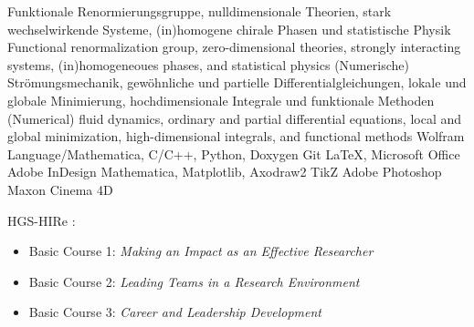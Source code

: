 \documentclass[color=TUDa-1b]{komacv}
\begin{document}




\cvitem%
	{}%
	{\lang%
		{Funktionale Renormierungsgruppe, nulldimensionale Theorien, stark wechselwirkende Systeme, (in)homogene chirale Phasen und statistische Physik}%
		{Functional renormalization group, zero-dimensional theories, strongly interacting systems, (in)homogeneoues phases, and statistical physics}
	}
\cvitem%
	{}%
	{\lang%
		{(Numerische) Strömungsmechanik, gewöhnliche und partielle Differentialgleichungen, lokale und globale Minimierung, hochdimensionale Integrale und funktionale Methoden}%
		{(Numerical) fluid dynamics, ordinary and partial differential equations, local and global minimization, high-dimensional integrals, and functional methods}
	}
\cvitem%
	{}%
	{Wolfram Language/Mathematica, C/C++, Python, Doxygen Git}
\cvitem%
	{}%
	{\LaTeX, Microsoft Office Adobe InDesign}
\cvitem%
	{}%
	{Mathematica, Matplotlib, Axodraw2 TikZ}
\cvitem%
	{}%
	{Adobe Photoshop Maxon Cinema 4D}
\cvitem%
	{}%
	{%
		HGS-HIRe :\newline
		\begin{itemize}
		\setlength\itemsep{-.1em}
			\item Basic Course 1: \textit{Making an Impact as an Effective Researcher}
			\item Basic Course 2: \textit{Leading Teams in a Research Environment}
			\item Basic Course 3: \textit{Career and Leadership Development}
		\end{itemize}
	}
\end{document}
